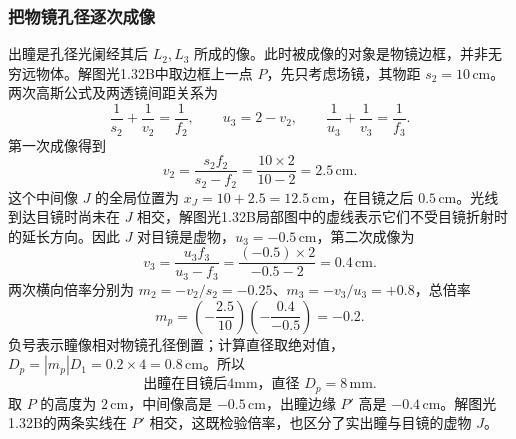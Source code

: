 \documentclass[UTF8,fontset=fandol,a4paper,11pt]{ctexart}
\begin{document}
\subsubsection*{把物镜孔径逐次成像}
出瞳是孔径光阑经其后 $L_2,L_3$ 所成的像。此时被成像的对象是物镜边框，并非无穷远物体。解图光1.32B中取边框上一点 $P$，先只考虑场镜，其物距 $s_2=10\,\mathrm{cm}$。两次高斯公式及两透镜间距关系为
\[
\frac1{s_2}+\frac1{v_2}=\frac1{f_2},\qquad
u_3=2-v_2,\qquad
\frac1{u_3}+\frac1{v_3}=\frac1{f_3}.
\]
第一次成像得到
\[
v_2=\frac{s_2f_2}{s_2-f_2}
=\frac{10\times2}{10-2}=2.5\,\mathrm{cm}.
\]
这个中间像 $J$ 的全局位置为 $x_J=10+2.5=12.5\,\mathrm{cm}$，在目镜之后 $0.5\,\mathrm{cm}$。光线到达目镜时尚未在 $J$ 相交，解图光1.32B局部图中的虚线表示它们不受目镜折射时的延长方向。因此 $J$ 对目镜是虚物，$u_3=-0.5\,\mathrm{cm}$，第二次成像为
\[
v_3=\frac{u_3f_3}{u_3-f_3}
=\frac{(-0.5)\times2}{-0.5-2}
=0.4\,\mathrm{cm}.
\]
两次横向倍率分别为 $m_2=-v_2/s_2=-0.25$、$m_3=-v_3/u_3=+0.8$，总倍率
\[
m_p=\left(-\frac{2.5}{10}\right)
\left(-\frac{0.4}{-0.5}\right)=-0.2.
\]
负号表示瞳像相对物镜孔径倒置；计算直径取绝对值，$D_p=|m_p|D_1=0.2\times4=0.8\,\mathrm{cm}$。所以
\[
\boxed{\text{出瞳在目镜后4mm，直径 }D_p=8\,\mathrm{mm}}.
\]
取 $P$ 的高度为 $2\,\mathrm{cm}$，中间像高是 $-0.5\,\mathrm{cm}$，出瞳边缘 $P'$ 高是 $-0.4\,\mathrm{cm}$。解图光1.32B的两条实线在 $P'$ 相交，这既检验倍率，也区分了实出瞳与目镜的虚物 $J$。
\end{document}
